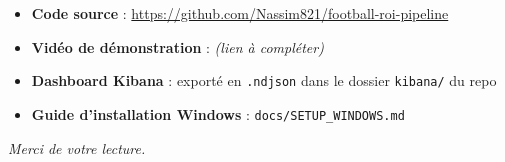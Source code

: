 \documentclass[11pt,a4paper]{article}
\begin{document}
\begin{itemize}
  \item \textbf{Code source} : \url{https://github.com/Nassim821/football-roi-pipeline}
  \item \textbf{Vidéo de démonstration} : \textit{(lien à compléter)}
  \item \textbf{Dashboard Kibana} : exporté en \texttt{.ndjson} dans le dossier \texttt{kibana/} du repo
  \item \textbf{Guide d'installation Windows} : \texttt{docs/SETUP\_WINDOWS.md}
\end{itemize}

\vspace{1cm}
\begin{center}
\textit{Merci de votre lecture.}
\end{center}
\end{document}
